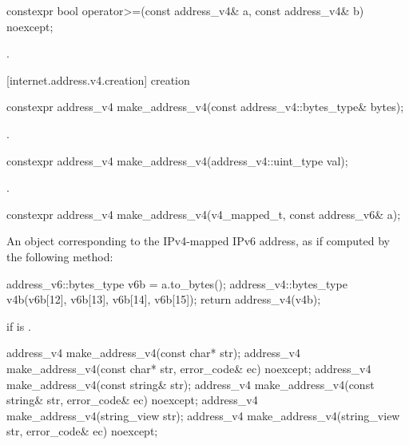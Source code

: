 %
\begin{itemdecl}
constexpr bool operator>=(const address_v4& a, const address_v4& b) noexcept;
\end{itemdecl}

\begin{itemdescr}
\pnum
\returns {}.
\end{itemdescr}



%
[internet.address.v4.creation]{ creation}

\begin{itemdecl}
constexpr address_v4 make_address_v4(const address_v4::bytes_type& bytes);
\end{itemdecl}

\begin{itemdescr}
\pnum
\returns {}.
\end{itemdescr}

\begin{itemdecl}
constexpr address_v4 make_address_v4(address_v4::uint_type val);
\end{itemdecl}

\begin{itemdescr}
\pnum
\returns {}.
\end{itemdescr}

\begin{itemdecl}
constexpr address_v4 make_address_v4(v4_mapped_t, const address_v6& a);
\end{itemdecl}

\begin{itemdescr}
\pnum
\returns An  object corresponding to the IPv4-mapped IPv6 address, as if computed by the following method:
\begin{codeblock}
address_v6::bytes_type v6b = a.to_bytes();
address_v4::bytes_type v4b(v6b[12], v6b[13], v6b[14], v6b[15]);
return address_v4(v4b);
\end{codeblock}


\pnum
\remarks {} if  is .
\end{itemdescr}

\begin{itemdecl}
address_v4 make_address_v4(const char* str);
address_v4 make_address_v4(const char* str, error_code& ec) noexcept;
address_v4 make_address_v4(const string& str);
address_v4 make_address_v4(const string& str, error_code& ec) noexcept;
address_v4 make_address_v4(string_view str);
address_v4 make_address_v4(string_view str, error_code& ec) noexcept;
\end{itemdecl}


